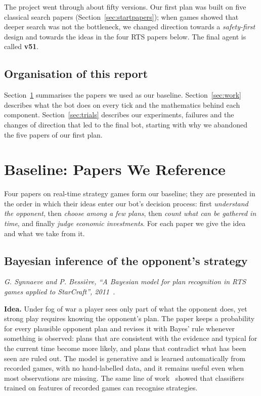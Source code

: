 The project went through about fifty versions. Our first plan was built on five classical search papers
(Section~\ref{sec:startpapers}); when games showed that deeper search was not the bottleneck, we changed
direction towards a \emph{safety-first} design and towards the ideas in the four RTS papers below. The
final agent is called \textbf{v51}.

\subsection{Organisation of this report}

Section~\ref{sec:baseline} summarises the papers we used as our baseline. Section~\ref{sec:work} describes
what the bot does on every tick and the mathematics behind each component. Section~\ref{sec:trials}
describes our experiments, failures and the changes of direction that led to the final bot, starting with
why we abandoned the five papers of our first plan.

\section{Baseline: Papers We Reference}\label{sec:baseline}

Four papers on real-time strategy games form our baseline; they are presented in the order in which their
ideas enter our bot's decision process: first \emph{understand the opponent}, then \emph{choose among a few
plans}, then \emph{count what can be gathered in time}, and finally \emph{judge economic investments}. For
each paper we give the idea and what we take from it.

\subsection{Bayesian inference of the opponent's strategy}

\emph{G. Synnaeve and P. Bessi\`ere, ``A Bayesian model for plan recognition in RTS games applied to
StarCraft'', 2011~\cite{synnaeve}.}

\textbf{Idea.} Under fog of war a player sees only part of what the opponent does, yet strong play requires
knowing the opponent's plan. The paper keeps a probability for every plausible opponent plan and revises it
with Bayes' rule whenever something is observed: plans that are consistent with the evidence and typical for
the current time become more likely, and plans that contradict what has been seen are ruled out. The model is
generative and is learned automatically from recorded games, with no hand-labelled data, and it remains
useful even when most observations are missing. The same line of work~\cite{weber} showed that classifiers
trained on features of recorded games can recognise strategies.

